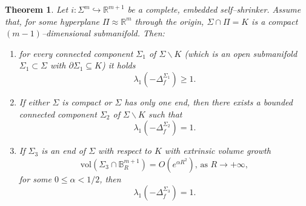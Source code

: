 \documentclass[11pt,leqno]{amsart}\usepackage{amsmath}
\newtheorem{theorem}{Theorem}
\numberwithin{equation}{section}
\begin{document}
\begin{theorem} \label{th_spectral}
Let $i:\Sigma^{m}\hookrightarrow\mathbb{R}^{m+1}$ be a complete, embedded
self--shrinker. Assume that, for some hyperplane $\Pi\approx\mathbb{R}^{m}$
through the origin, $\Sigma\cap\Pi=K$ is a compact $\left(  m-1\right)
$--dimensional submanifold. Then:

\begin{enumerate}
\item[(a)] for every connected component $\Sigma_{1}$ of $\Sigma\backslash K$
(which is an open submanifold $\Sigma_{1}\subset\Sigma$ with $\partial
\Sigma_{1}\subseteq K$) it holds\[
\lambda_{1}(  -\Delta_{f}^{\Sigma_{1}})  \geq1.
\]


\item[(b)] If either $\Sigma$ is compact or $\Sigma$ has only one end, then
there exists a bounded connected component $\Sigma_{2}$ of $\Sigma\backslash
K$ such that\[
\lambda_{1}(  -\Delta_{f}^{\Sigma_{2}})  =1.
\]


\item[(c)] If $\Sigma_{3}$ is an end of $\Sigma$ with respect to $K$ with extrinsic volume growth
\begin{equation}\label{ExtrVolSubExpQuadrEnd}
\mathrm{vol}\left(  \Sigma_{3}\cap\mathbb{B}_{R}^{m+1}\right)  =O(
e^{\alpha R^{2}})  \text{, as }R\rightarrow+\infty,
\end{equation}
for some $0\leq\alpha<1/2$, then
\[
\lambda_{1}(  -\Delta_{f}^{\Sigma_{3}})  =1.
\]

\end{enumerate}
\end{theorem}
\end{document}
